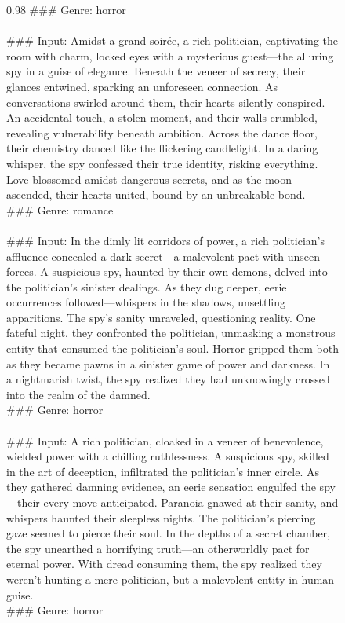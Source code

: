 \begin{figure}[H]
\begin{boxedminipage}{0.98\textwidth}
\#\#\# Genre: horror\\
\\
\#\#\# Input: Amidst a grand soirée, a rich politician, captivating the room with charm, locked eyes with a mysterious guest—the alluring spy in a guise of elegance. Beneath the veneer of secrecy, their glances entwined, sparking an unforeseen connection. As conversations swirled around them, their hearts silently conspired. An accidental touch, a stolen moment, and their walls crumbled, revealing vulnerability beneath ambition. Across the dance floor, their chemistry danced like the flickering candlelight. In a daring whisper, the spy confessed their true identity, risking everything. Love blossomed amidst dangerous secrets, and as the moon ascended, their hearts united, bound by an unbreakable bond.\\
\#\#\# Genre: romance\\
\\
\#\#\# Input: In the dimly lit corridors of power, a rich politician's affluence concealed a dark secret—a malevolent pact with unseen forces. A suspicious spy, haunted by their own demons, delved into the politician's sinister dealings. As they dug deeper, eerie occurrences followed—whispers in the shadows, unsettling apparitions. The spy's sanity unraveled, questioning reality. One fateful night, they confronted the politician, unmasking a monstrous entity that consumed the politician's soul. Horror gripped them both as they became pawns in a sinister game of power and darkness. In a nightmarish twist, the spy realized they had unknowingly crossed into the realm of the damned.\\
\#\#\# Genre: horror\\
\\
\#\#\# Input: A rich politician, cloaked in a veneer of benevolence, wielded power with a chilling ruthlessness. A suspicious spy, skilled in the art of deception, infiltrated the politician's inner circle. As they gathered damning evidence, an eerie sensation engulfed the spy—their every move anticipated. Paranoia gnawed at their sanity, and whispers haunted their sleepless nights. The politician's piercing gaze seemed to pierce their soul. In the depths of a secret chamber, the spy unearthed a horrifying truth—an otherworldly pact for eternal power. With dread consuming them, the spy realized they weren't hunting a mere politician, but a malevolent entity in human guise.\\
\#\#\# Genre: horror\\
\\

\end{boxedminipage}
\end{figure}
